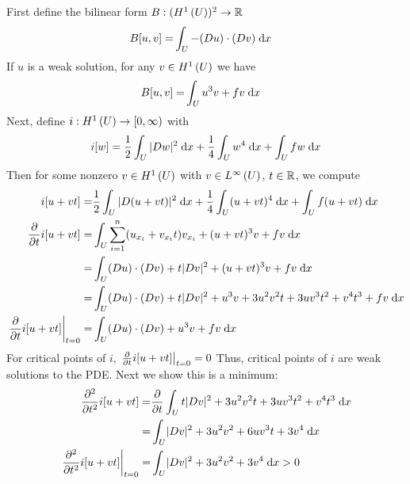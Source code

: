 First define the bilinear form $B: (H^{1}\left(U \right))^2 \rightarrow \mathbb{R}$
\begin{align*}
  B[u, v] = &\int_{U} -(D u) \cdot (D v) \;\mathrm{d}x
\end{align*}
If $u$ is a weak solution, for any $v \in H^{1}\left(U \right)$ we have
\begin{align*}
  B[u, v] = &\int_{U} u^3 v + f v \;\mathrm{d}x
\end{align*}
Next, define $i: H^{1}\left(U \right) \rightarrow [0, \infty)$ with
\begin{align*}
  i[w] = \frac{1}{2} \int_U |D w|^2 \;\mathrm{d}x
         + \frac{1}{4} \int_U w^4 \;\mathrm{d}x
         + \int_U f w \;\mathrm{d}x
\end{align*}
Then for some nonzero $v \in H^{1}\left(U \right)$ with $v \in L^{\infty}\left(U \right)$, $t \in \mathbb{R}$,
we compute
\begin{align*}
  i[u + v t] = &\frac{1}{2} \int_U |D (u + v t)|^2 \;\mathrm{d}x
                + \frac{1}{4} \int_U (u + v t)^4 \;\mathrm{d}x
                + \int_U f (u + v t) \;\mathrm{d}x\\
  \frac{\partial }{\partial t} i[u + v t]
             = &\int_U \sum_{i = 1}^n (u_{x_i} + v_{x_i} t) v_{x_i}
                + (u + v t)^3 v + f v \;\mathrm{d}x\\
             = &\int_U (D u) \cdot (D v) + t \lvert D v \rvert^2
                + (u + v t)^3 v + f v \;\mathrm{d}x\\
             = &\int_U (D u) \cdot (D v) + t \lvert D v \rvert^2
                + u^3 v + 3 u^2 v^2 t + 3 u v^3 t^2 + v^4 t^3 + f v \;\mathrm{d}x\\
  \left. \frac{\partial }{\partial t} i[u + v t] \right \rvert_{t = 0}
             = &\int_U (D u) \cdot (D v) + u^3 v + f v \;\mathrm{d}x
\end{align*}
For critical points of $i$, $\left. \frac{\partial }{\partial t} i[u + v t] \right \rvert_{t = 0} = 0$
Thus, critical points of $i$ are weak solutions to the PDE.
Next we show this is a minimum:
\begin{align*}
  \frac{\partial^{2} }{\partial t^{2}} i[u + v t]
    = &\frac{\partial }{\partial t} \int_U t \lvert D v \rvert^2
                                + 3 u^2 v^2 t + 3 u v^3 t^2 + v^4 t^3 \;\mathrm{d}x\\
    = & \int_U \lvert D v \rvert^2 + 3 u^2 v^2 + 6 u v^3 t + 3 v^4 \;\mathrm{d}x\\
  \left. \frac{\partial^{2} }{\partial t^{2}} i[u + v t] \right\rvert_{t = 0}
    = &\int_U \lvert D v \rvert^2 + 3 u^2 v^2 + 3 v^4 \;\mathrm{d}x > 0
\end{align*}
